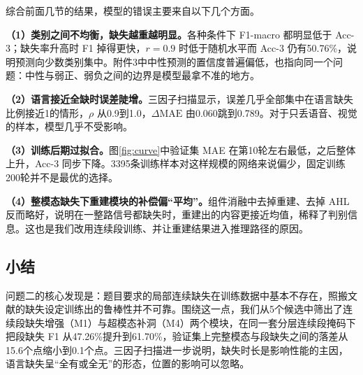 综合前面几节的结果，模型的错误主要来自以下几个方面。

\textbf{（1）类别之间不均衡，缺失越重越明显。}各种条件下 F1-macro 都明显低于 Acc-3；缺失率升高时 F1 掉得更快，$r=0.9$ 时低于随机水平而 Acc-3 仍有50.76\%，说明预测向少数类别集中。附件3中中性预测的置信度普遍偏低，也指向同一个问题：中性与弱正、弱负之间的边界是模型最拿不准的地方。

\textbf{（2）语言接近全缺时误差陡增。}三因子扫描显示，误差几乎全部集中在语言缺失比例接近1的情形，$\rho$ 从0.9到1.0，$\Delta\mathrm{MAE}$ 由0.060跳到0.789。对于只丢语音、视觉的样本，模型几乎不受影响。

\textbf{（3）训练后期过拟合。}图\ref{fig:curve}中验证集 MAE 在第10轮左右最低，之后整体上升，Acc-3 同步下降。3395条训练样本对这样规模的网络来说偏少，固定训练200轮并不是最优的选择。

\textbf{（4）整模态缺失下重建模块的补偿偏“平均”。}组件消融中去掉重建、去掉 AHL 反而略好，说明在一整路信号都缺失时，重建出的内容更接近均值，稀释了判别信息。这也是我们改用连续段训练、并让重建结果进入推理路径的原因。

\subsection{小结}

问题二的核心发现是：题目要求的局部连续缺失在训练数据中基本不存在，照搬文献的缺失设定训练出的鲁棒性并不可靠。围绕这一点，我们从5个候选中筛出了连续段缺失增强（M1）与超模态补洞（M4）两个模块，在同一套分层连续段掩码下把段缺失 F1 从47.26\%提升到61.70\%，验证集上完整模态与段缺失之间的落差从15.6个点缩小到0.1个点。三因子扫描进一步说明，缺失时长是影响性能的主因，语言缺失呈“全有或全无”的形态，位置的影响可以忽略。
